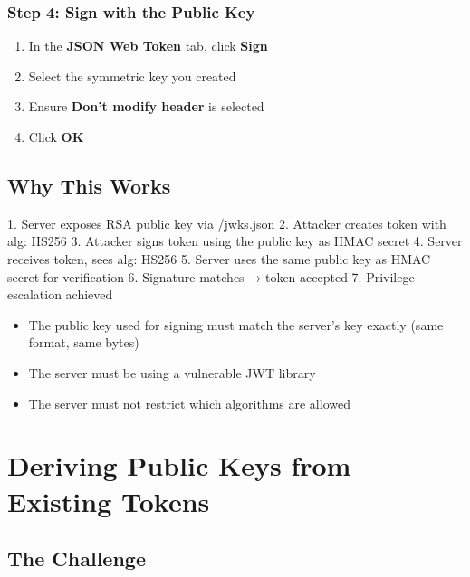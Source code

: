 \documentclass{article}
\begin{document}
\subsubsection{Step 4: Sign with the Public Key}

\begin{enumerate}
    \item In the \textbf{JSON Web Token} tab, click \textbf{Sign}
    \item Select the symmetric key you created
    \item Ensure \textbf{Don't modify header} is selected
    \item Click \textbf{OK}
\end{enumerate}

\subsection{Why This Works}

\begin{attackbox}
1. Server exposes RSA public key via /jwks.json
2. Attacker creates token with alg: HS256
3. Attacker signs token using the public key as HMAC secret
4. Server receives token, sees alg: HS256
5. Server uses the same public key as HMAC secret for verification
6. Signature matches → token accepted
7. Privilege escalation achieved
\end{attackbox}

\begin{notebox}
\begin{itemize}
    \item The public key used for signing must match the server's key exactly (same format, same bytes)
    \item The server must be using a vulnerable JWT library
    \item The server must not restrict which algorithms are allowed
\end{itemize}
\end{notebox}

\section{Deriving Public Keys from Existing Tokens}

\subsection{The Challenge}
\end{document}
